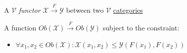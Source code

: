 A $\mathcal{V}$ \emph{functor} $\mathcal{X}\xrightarrow{F}\mathcal{Y}$ between two $\mathcal{V}$ \hyperref[D2.46]{categories}

A function $Ob(\mathcal{X})\xrightarrow{F}Ob(\mathcal{Y})$ subject to the constraint:
\begin{itemize}
  \item $\forall x_1,x_2 \in Ob(\mathcal{X}): \mathcal{X}(x_1,x_2) \leq \mathcal{Y}(F(x_1),F(x_2))$
\end{itemize}
